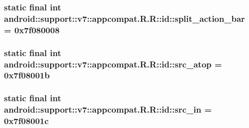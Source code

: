 \hypertarget{classandroid_1_1support_1_1v7_1_1appcompat_1_1_r_1_1id_305ab80770ffe6a9f443ec840387a783}{
\subsubsection[{split\_\-action\_\-bar}]{\setlength{\rightskip}{0pt plus 5cm}static final int android::support::v7::appcompat.R.R::id::split\_\-action\_\-bar = 0x7f080008}}
\label{classandroid_1_1support_1_1v7_1_1appcompat_1_1_r_1_1id_305ab80770ffe6a9f443ec840387a783}


\hypertarget{classandroid_1_1support_1_1v7_1_1appcompat_1_1_r_1_1id_8cc8ccd06596f4885b228e89f41cc12b}{
\subsubsection[{src\_\-atop}]{\setlength{\rightskip}{0pt plus 5cm}static final int android::support::v7::appcompat.R.R::id::src\_\-atop = 0x7f08001b}}
\label{classandroid_1_1support_1_1v7_1_1appcompat_1_1_r_1_1id_8cc8ccd06596f4885b228e89f41cc12b}


\hypertarget{classandroid_1_1support_1_1v7_1_1appcompat_1_1_r_1_1id_714ad167ac9a6a9be50d7bcb77bb34bf}{
\subsubsection[{src\_\-in}]{\setlength{\rightskip}{0pt plus 5cm}static final int android::support::v7::appcompat.R.R::id::src\_\-in = 0x7f08001c}}
\label{classandroid_1_1support_1_1v7_1_1appcompat_1_1_r_1_1id_714ad167ac9a6a9be50d7bcb77bb34bf}


